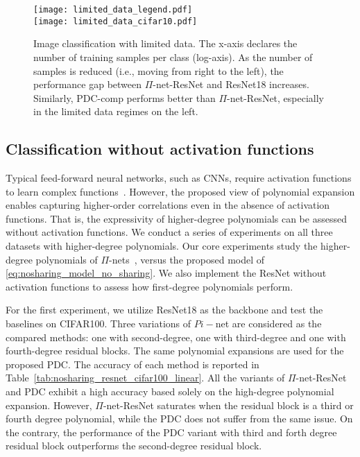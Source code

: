 \documentclass[runningheads]{llncs}
\newcommand{\resnet}{ResNet}
\newcommand{\modelres}{$\Pi$-net-\resnet}
\newcommand{\noshare}{PDC}
\begin{document}
\begin{figure}
\centering
    \centering
    \texttt{[image: limited\_data\_legend.pdf]} \\
    \texttt{[image: limited\_data\_cifar10.pdf]}
\caption{Image classification with limited data. The x-axis declares the number of training samples per class (log-axis). As the number of samples is reduced (i.e., moving from right to the left), the performance gap between \modelres{} and \resnet18 increases. Similarly, \noshare-comp performs better than \modelres, especially in the limited data regimes on the left.}
\label{fig:nosharing_experiment_limited_data}
\end{figure}


























\subsection{Classification without activation functions}

Typical feed-forward neural networks, such as CNNs, require activation functions to learn complex functions~\cite{hornik1989multilayer}. However, the proposed view of polynomial expansion enables capturing higher-order correlations even in the absence of activation functions.
That is, the expressivity of higher-degree polynomials can be assessed without activation functions. We conduct a series of experiments on all three datasets with higher-degree polynomials. Our core experiments study the higher-degree polynomials of $\Pi$-nets~\cite{chrysos2020poly}, versus the proposed model of \eqref{eq:nosharing_model_no_sharing}. We also implement the \resnet{} without activation functions to assess how first-degree polynomials perform. 

For the first experiment, we utilize \resnet18 as the backbone and test the baselines on CIFAR100. Three variations of $Pi-$net are considered as the compared methods: one with second-degree, one with third-degree and one with fourth-degree residual blocks. The same polynomial expansions are used for the proposed \noshare. 
The accuracy of each method is reported in Table~\ref{tab:nosharing_resnet_cifar100_linear}. All the variants of \modelres{} and \noshare{} exhibit a high accuracy based solely on the high-degree polynomial expansion. However, \modelres{} saturates when the residual block is a third or fourth degree polynomial, while the \noshare{} does not suffer from the same issue. On the contrary, the performance of the \noshare{} variant with third and forth degree residual block outperforms the second-degree residual block. 
\end{document}
